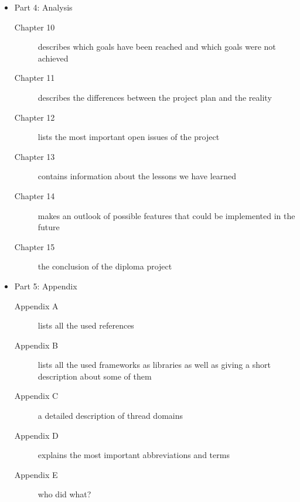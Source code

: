 \begin{itemize}
 \item Part 4: Analysis
 \begin{description}
  \item[Chapter 10] describes which goals have been reached and which goals
                    were not achieved
  \item[Chapter 11] describes the differences between the project plan and
                    the reality
  \item[Chapter 12] lists the most important open issues of the project
  \item[Chapter 13] contains information about the lessons we have learned
  \item[Chapter 14] makes an outlook of possible features that could be
                    implemented in the future
  \item[Chapter 15] the conclusion of the diploma project
 \end{description}
 
 \item Part 5: Appendix
 \begin{description}
  \item[Appendix A] lists all the used references
  \item[Appendix B] lists all the used frameworks as libraries as well as 
                   giving a short description about some of them
  \item[Appendix C] a detailed description of thread domains
  \item[Appendix D] explains the most important abbreviations and terms
  \item[Appendix E] who did what?
 \end{description}
\end{itemize}